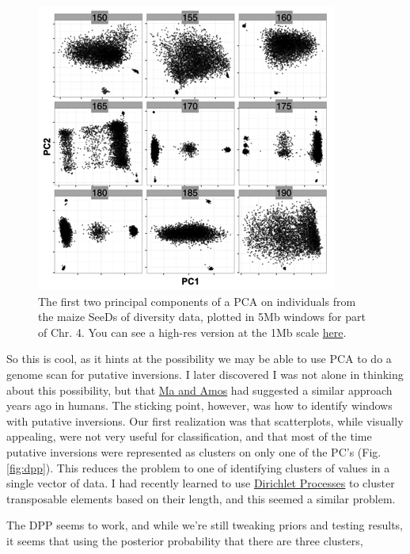 \documentclass[]{article}
\begin{document}
\begin{figure}[h]   
  \begin{center}
   \includegraphics[width=0.7\linewidth]{inversions_pca.png}
   \caption{ The first two principal components of a PCA on individuals from the maize SeeDs of diversity data, plotted in 5Mb windows for part of Chr. 4. You can see a high-res version at the 1Mb scale \href{}{here}.} 
    \label{fig:pcs}
  \end{center}
\end{figure}

So this is cool, as it hints at the possibility we may be able to use PCA to do a genome scan for putative inversions. 
I later discovered I was not alone in thinking about this possibility, but that \href{http://journals.plos.org/plosone/article?id=10.1371/journal.pone.0040224}{Ma and Amos} had suggested a similar approach years ago in humans.  
The sticking point, however, was how to identify windows with putative inversions.  
Our first realization was that  scatterplots, while visually appealing,  were not very useful for classification, and that most of the time putative inversions were represented as clusters on only one of the PC's (Fig. \ref{fig:dpp}).  
This reduces the problem to one of identifying clusters of values in a single vector of data. 
I had recently learned to use \href{https://en.wikipedia.org/wiki/Dirichlet_process}{Dirichlet Processes} to cluster transposable elements based on their length, and this seemed a similar problem. 

The DPP seems to work, and while we're still tweaking priors and testing results, it seems that using the posterior probability that there are three clusters,
\end{document}
